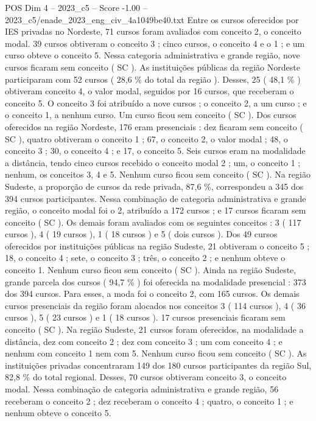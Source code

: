 \begin{textsample}{POS Dim 4 – 2023\_c5 – Score -1.00 – 2023\_c5/enade\_2023\_eng\_civ\_4a1049be40.txt}
Entre os cursos oferecidos por IES privadas no Nordeste, 71 cursos foram avaliados com conceito 2, o conceito modal. 39 cursos obtiveram o conceito 3 ; cinco cursos, o conceito 4 e o 1 ; e um curso obteve o conceito 5.
Nessa categoria administrativa e grande região, nove cursos ficaram sem conceito ( SC ).
As instituições públicas da região Nordeste participaram com 52 cursos ( 28,6 \% do total da região ).
Desses, 25 ( 48,1 \% ) obtiveram conceito 4, o valor modal, seguidos por 16 cursos, que receberam o conceito 5.
O conceito 3 foi atribuído a nove cursos ; o conceito 2, a um curso ; e o conceito 1, a nenhum curso.
Um curso ficou sem conceito ( SC ).
Dos cursos oferecidos na região Nordeste, 176 eram presenciais : dez ficaram sem conceito ( SC ), quatro obtiveram o conceito 1 ; 67, o conceito 2, o valor modal ; 48, o conceito 3 ; 30, o conceito 4 ; e 17, o conceito 5.
Seis cursos eram na modalidade a distância, tendo cinco cursos recebido o conceito modal 2 ; um, o conceito 1 ; nenhum, os conceitos 3, 4 e 5.
Nenhum curso ficou sem conceito ( SC ).
Na região Sudeste, a proporção de cursos da rede privada, 87,6 \%, correspondeu a 345 dos 394 cursos participantes.
Nessa combinação de categoria administrativa e grande região, o conceito modal foi o 2, atribuído a 172 cursos ; e 17 cursos ficaram sem conceito ( SC ).
Os demais foram avaliados com os seguintes conceitos : 3 ( 117 cursos ), 4 ( 19 cursos ), 1 ( 18 cursos ) e 5 ( dois cursos ).
Dos 49 cursos oferecidos por instituições públicas na região Sudeste, 21 obtiveram o conceito 5 ; 18, o conceito 4 ; sete, o conceito 3 ; três, o conceito 2 ; e nenhum obteve o conceito 1.
Nenhum curso ficou sem conceito ( SC ).
Ainda na região Sudeste, grande parcela dos cursos ( 94,7 \% ) foi oferecida na modalidade presencial : 373 dos 394 cursos.
Para esses, a moda foi o conceito 2, com 165 cursos.
Os demais cursos presenciais da região foram alocados nos conceitos 3 ( 114 cursos ), 4 ( 36 cursos ), 5 ( 23 cursos ) e 1 ( 18 cursos ). 17 cursos presenciais ficaram sem conceito ( SC ).
Na região Sudeste, 21 cursos foram oferecidos, na modalidade a distância, dez com conceito 2 ; dez com conceito 3 ; um com conceito 4 ; e nenhum com conceito 1 nem com 5.
Nenhum curso ficou sem conceito ( SC ).
As instituições privadas concentraram 149 dos 180 cursos participantes da região Sul, 82,8 \% do total regional.
Desses, 70 cursos obtiveram conceito 3, o conceito modal.
Nessa combinação de categoria administrativa e grande região, 56 receberam o conceito 2 ; dez receberam o conceito 4 ; quatro, o conceito 1 ; e nenhum obteve o conceito 5.

\end{textsample}
